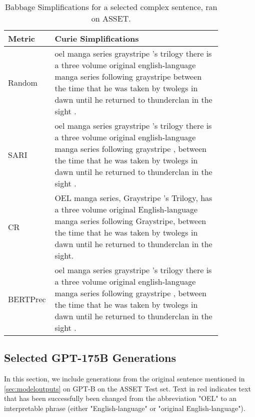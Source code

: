 \documentclass[11pt]{article}
\begin{document}
\begin{table*}[htbp]
            \small  
             \renewcommand{\arraystretch}{1.5}
        \begin{tabular}{p{0.1\linewidth} p{0.75\linewidth}} \toprule
        Metric   & Curie Simplifications \\   \midrule                                                                                                     
        Random   &  oel manga series graystripe 's trilogy there is a three volume original english-language manga series following graystripe between the time that he was taken by twolegs in dawn until he returned to thunderclan in the sight .\\
        \midrule
        SARI   &  oel manga series graystripe 's trilogy there is a three volume original english-language manga series following graystripe , between the time that he was taken by twolegs in dawn until he returned to thunderclan in the sight .\\
        \midrule
        CR   &  OEL manga series, Graystripe 's Trilogy, has a three volume original English-language manga series following Graystripe, between the time that he was taken by twolegs in dawn until he returned to thunderclan in the sight.
\\
        \midrule
        BERTPrec   &  oel manga series graystripe 's trilogy there is a three volume original english-language manga series following graystripe , between the time that he was taken by twolegs in dawn until he returned to thunderclan in the sight .\\ 
        \bottomrule
        \end{tabular}
        \caption{Babbage Simplifications for a selected complex sentence, ran on ASSET.} 
        \label{tab:babbage}
    \end{table*}


\subsection{Selected GPT-175B Generations}
\label{ssec:dv3asset}
In this section, we include generations from the original sentence mentioned in \ref{sec:modeloutputs} on GPT-B on the ASSET Test set. Text in \textcolor{Mycolor3}{red} indicates text that has been successfully been changed from the abbreviation "OEL" to an interpretable phrase (either "English-language" or "original English-language"). 
\end{document}
